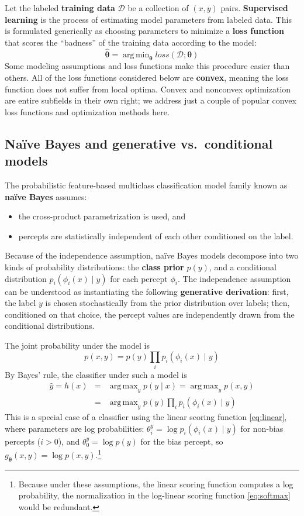 \documentclass[11pt,letterpaper]{article}
\DeclareMathOperator*{\argmax}{arg\,max}
\DeclareMathOperator*{\argmin}{arg\,min}
\newcommand{\eref}[1]{\eqref{#1}}
\begin{document}
Let the labeled \textbf{training data} $\mathcal{D}$ be a collection of $(x,y)$ pairs.
\textbf{Supervised learning} is the process of estimating model parameters from labeled data.
This is formulated generically as choosing parameters to minimize a \textbf{loss function} that scores the 
``badness'' of the training data according to the model:
\begin{equation}
\hat{\boldsymbol{\theta}} = \argmin_{\boldsymbol{\theta}} \textit{loss}(\mathcal{D}; \boldsymbol{\theta})
\end{equation}
Some modeling assumptions and loss functions make this procedure easier than others.
All of the loss functions considered below are \textbf{convex}, 
meaning the loss function does not suffer from local optima.
Convex and nonconvex optimization are entire subfields in their own right; 
we address just a couple of popular convex loss functions and optimization methods here.

\subsection{Na\"{i}ve Bayes and generative vs.~conditional models}

The probabilistic feature-based multiclass classification model family known as \textbf{na\"{i}ve Bayes} assumes:
\begin{itemize}
  \item the cross-product parametrization is used, and
  \item percepts are statistically independent of each other conditioned on the label.
\end{itemize}

Because of the independence assumption, na\"{i}ve Bayes models decompose into two kinds of probability distributions:
the \textbf{class prior} $p(y)$, and a conditional distribution $p_i(\phi_i(x) \mid y)$ for each percept $\phi_i$.
The independence assumption can be understood as instantiating the following \textbf{generative derivation}:
first, the label $y$ is chosen stochastically from the prior distribution over labels; 
then, conditioned on that choice, the percept values are independently drawn from the conditional distributions.

The joint probability under the model is
\begin{equation}
p(x,y) = p(y)\prod_i{p_i(\phi_i(x) \mid y)}
\end{equation}
By Bayes' rule, the classifier under such a model is
\begin{eqnarray}
\hat{y} = h(x) &=& \argmax_y{p(y \mid x)} = \argmax_y{p(x,y)} \\
               &=& \argmax_y{p(y)\prod_i{p_i(\phi_i(x) \mid y)}}
\end{eqnarray}
This is a special case of a classifier using the linear scoring function \eref{eq:linear}, 
where parameters are log probabilities: $\theta^y_i = \log{p_i(\phi_i(x) \mid y)}$ for non-bias percepts ($i>0$), and 
$\theta^y_0 = \log{p(y)}$ for the bias percept, so $g_{\boldsymbol{\theta}}(x,y)=\log{p(x,y)}$.\footnote{Because under these assumptions, 
the linear scoring function computes a log probability, the normalization in the log-linear scoring function \eref{eq:softmax} would be redundant.}
\end{document}
